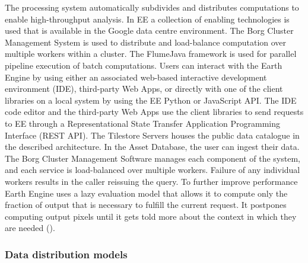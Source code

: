 The processing system automatically subdivides and distributes computations to enable high-throughput analysis. In EE a collection of enabling technologies is used that is available in the Google data centre environment. The Borg Cluster Management System is used to distribute and load-balance computation over multiple workers within a cluster. The FlumeJava framework is used for parallel pipeline execution of batch computations.
Users can interact with the Earth Engine by using either an associated web-based interactive development environment (IDE), third-party Web Apps, or directly with one of the client libraries on a local system by using the EE Python or JavaScript API.
The IDE code editor and the third-party Web Apps use the client libraries to send requests to EE through a Representational State Transfer Application Programming Interface (REST API). 
The Tilestore Servers houses the public data catalogue in the described architecture. In the Asset Database, the user can ingest their data. 
The Borg Cluster Management Software manages each component of the system, and each service is load-balanced over multiple workers. Failure of any individual workers results in the caller reissuing the query. 
To further improve performance Earth Engine uses a lazy evaluation model that allows it to compute only the fraction of output that is necessary to fulfill the current request. It postpones computing output pixels until it gets told more about the context in which they are needed (\cite{gorelick2017google}).

\subsubsection{Data distribution models}

